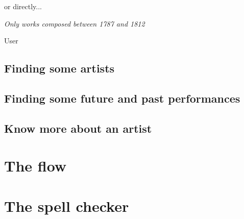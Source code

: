 \documentclass[a4paper,12pt]{report}
\begin{document}
	or directly...
	\epigraph{\textit{Only works composed between 1787 and 1812}}{User}
	\subsection{Finding some artists}
	\subsection{Finding some future and past performances}
	\subsection{Know more about an artist}
	
	\section{The flow}
	\section{The spell checker}
\end{document}
